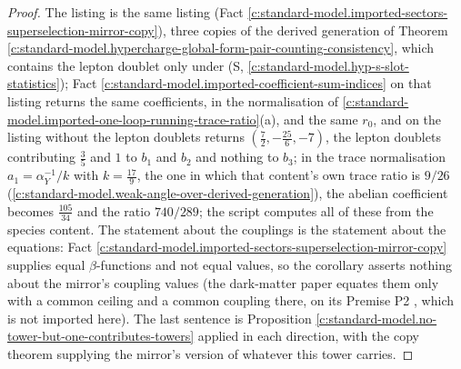 \documentclass[11pt]{article}
\theoremstyle{definition}
\theoremstyle{plain}
\begin{document}
\begin{proof}
The listing is the same listing (Fact \ref{c:standard-model.imported-sectors-superselection-mirror-copy}), three copies of the derived generation of Theorem \ref{c:standard-model.hypercharge-global-form-pair-counting-consistency}, which contains the lepton doublet only under (S, \ref{c:standard-model.hyp-s-slot-statistics}); Fact \ref{c:standard-model.imported-coefficient-sum-indices} on that listing returns the same coefficients, in the normalisation of \ref{c:standard-model.imported-one-loop-running-trace-ratio}(a), and the same $r_{0}$, and on the listing without the lepton doublets returns $(\tfrac72, -\tfrac{25}{6}, -7)$, the lepton doublets contributing $\tfrac35$ and $1$ to $b_{1}$ and $b_{2}$ and nothing to $b_{3}$; in the trace normalisation $a_{1} = \alpha_{Y}^{-1}/k$ with $k = \tfrac{17}{9}$, the one in which that content's own trace ratio is $9/26$ (\ref{c:standard-model.weak-angle-over-derived-generation}), the abelian coefficient becomes $\tfrac{105}{34}$ and the ratio $740/289$; the script computes all of these from the species content. The statement about the couplings is the statement about the equations: Fact \ref{c:standard-model.imported-sectors-superselection-mirror-copy} supplies equal $\beta$-functions and not equal values, so the corollary asserts nothing about the mirror's coupling values (the dark-matter paper equates them only with a common ceiling and a common coupling there, on its Premise P2 \cite[Thm.~4.3(iii),(iv)]{ButlerT14}, which is not imported here). The last sentence is Proposition \ref{c:standard-model.no-tower-but-one-contributes-towers} applied in each direction, with the copy theorem supplying the mirror's version of whatever this tower carries.

\end{proof}
\end{document}
